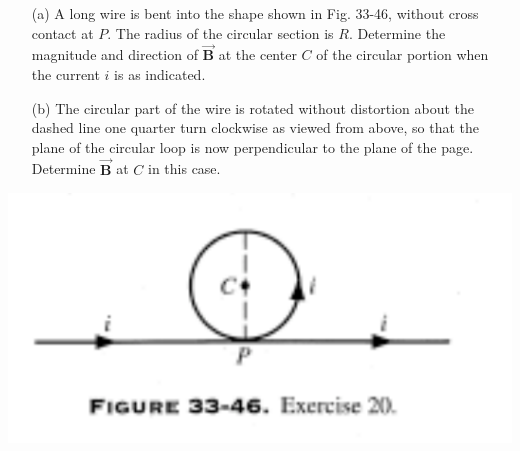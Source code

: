 \documentclass[12pt,letterpaper,boxed,cm]{hmcpset}
\begin{document}

\begin{problem}[33-E20]
	\begin{enumerate}
		\item[(a)] A long wire is bent into the shape shown in Fig. 33-46, without cross contact at $P$. The radius of the circular section is $R$. Determine the magnitude and direction of $\vec{\mathbf{B}}$ at the center $C$ of the circular portion when the current $i$ is as indicated.
		\item[(b)] The circular part of the wire is rotated without distortion about the dashed line one quarter turn clockwise as   viewed from above, so that the plane of the circular loop is now perpendicular to the plane of the page. Determine $\vec{\mathbf{B}}$ at $C$ in this case.
	\end{enumerate}	
	\begin{center}
		\includegraphics[scale=0.7]{01.png}
	\end{center}
\end{problem}
\begin{solution}
\end{solution}
\newpage
\end{document}
